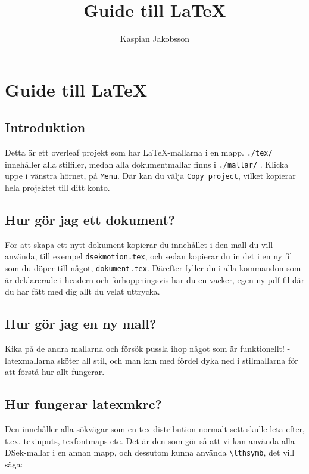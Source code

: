 \documentclass[nopdfbookmarks,a4paper, 11pt, twoside]{article}
\title{Guide till \LaTeX }
\author{Kaspian Jakobsson}
\begin{document}
\section*{Guide till \LaTeX }
\subsection{Introduktion}
Detta är ett overleaf projekt som har \LaTeX-mallarna i en mapp.
{\verb|./tex/|} innehåller alla stilfiler, medan alla dokumentmallar finns i {\verb|./mallar/|} . 
Klicka uppe i vänstra hörnet, på {\verb |Menu|}. Där kan du välja \verb|Copy project|, vilket kopierar hela projektet till ditt konto. 
\subsection{Hur gör jag ett dokument?}
För att skapa ett nytt dokument kopierar du innehållet i den mall du vill använda, till exempel {\verb|dsekmotion.tex|}, och sedan kopierar du in det i en ny fil som du döper till något, {\verb|dokument.tex|}. Därefter fyller du i alla kommandon som är deklarerade i headern och förhoppningsvis har du en vacker, egen ny pdf-fil där du har fått med dig allt du velat uttrycka. 

\subsection{Hur gör jag en ny mall?}
Kika på de andra mallarna och försök pussla ihop något som är funktionellt! \Dsymbol[3mm]-latexmallarna sköter all stil, och man kan med fördel dyka ned i stilmallarna för att förstå hur allt fungerar.

\subsection{Hur fungerar latexmkrc?}
Den innehåller alla sökvägar som en tex-distribution normalt sett skulle leta efter, t.ex. texinputs, texfontmaps etc. Det är den som gör så att vi kan använda alla DSek-mallar i en annan mapp, och dessutom kunna använda \verb|\lthsymb|, det vill säga:


\textcolor{datarosa}{\Huge \tlth  \fsek \esek \msek \vsek \asek \ksek \dsek \wsek} 
\end{document}
